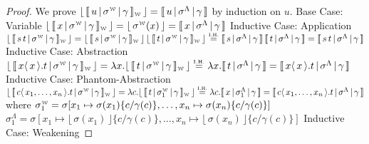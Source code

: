 \documentclass[a4paper,UKenglish,cleveref, autoref]{lipics-v2019}
\newcommand{\abs}[2]{\lambda #1 . #2}
\newcommand{\app}[2]{#1 \, #2}
\newcommand{\fake}[3]{#1 \langle \, #2 \, \rangle . #3}
\newcommand{\sub}[3]{#1 \{ #2 / #3 \}}
\newcommand{\weaksymbol}{\mbox{\tiny $\mathcal{W}$}}
\newcommand{\readbackwmap}[3]{\llbracket \, #1 \, \vert \, #2 \, \vert \, #3  \, \rrbracket }
\newcommand{\readweakwmap}[3]{\llbracket \, #1 \, \vert \, #2 \, \vert \, #3  \, \rrbracket_{\weaksymbol} }
\newcommand{\readbackweak}[1]{\lfloor \, #1 \, \rfloor}
\newcommand{\IH}{\stackrel{\hbox{\tiny I.H.}}{\hbox{=}}}
\begin{document}
\begin{proof}
We prove $\readbackweak{\readweakwmap{u}{\sigma^{\weaksymbol}}{\gamma}} = \readbackwmap{u}{\sigma^{\Lambda}}{\gamma}$ by induction on $u$.
\newline
\newline
Base Case: Variable
\newline
$\readbackweak{\readweakwmap{x}{\sigma^{\weaksymbol}}{\gamma}} = \readbackweak{\sigma^{\weaksymbol}(x)} = \readbackwmap{x}{\sigma^{\Lambda}}{\gamma}$
\newline
\newline
Inductive Case: Application
\newline
$\readbackweak{\readweakwmap{\app{s}{t}}{\sigma^{\weaksymbol}}{\gamma}} = \app{\readbackweak{\readweakwmap{s}{\sigma^{\weaksymbol}}{\gamma}}}{\readbackweak{\readweakwmap{t}{\sigma^{\weaksymbol}}{\gamma}}} \IH \app{\readbackwmap{s}{\sigma^{\Lambda}}{\gamma}}{\readbackwmap{t}{\sigma^{\Lambda}}{\gamma}} = \readbackwmap{\app{s}{t}}{\sigma^{\Lambda}}{\gamma}$
\newline
\newline
Inductive Case: Abstraction
\newline
$\readbackweak{\readweakwmap{\fake{x}{x}{t}}{\sigma^{\weaksymbol}}{\gamma}} = \abs{x}{\readbackweak{\readweakwmap{t}{\sigma^{\weaksymbol}}{\gamma}}} \IH \abs{x}{\readbackwmap{t}{\sigma^{\Lambda}}{\gamma}} = \readbackwmap{\fake{x}{x}{t}}{\sigma^{\Lambda}}{\gamma}$
\newline
\newline
Inductive Case: Phantom-Abstraction
\newline
$\readbackweak{\readweakwmap{\fake{c}{x_{1}, \dots, x_{n}}{t}}{\sigma^{\weaksymbol}}{\gamma}} = \abs{c}{\readbackweak{\readweakwmap{t}{\sigma_{1}^{\weaksymbol}}{\gamma}}} \IH \abs{c}{\readbackwmap{x}{\sigma_{1}^{\Lambda}}{\gamma}} = \readbackwmap{\fake{c}{x_{1}, \dots, x_{n}}{t}}{\sigma^{\Lambda}}{\gamma}$
\newline
where
\newline
$\sigma_{1}^{\weaksymbol} = \sigma [x_{1} \mapsto \sigma(x_{1}) \sub{}{c}{\gamma(c)}, \dots, x_{n} \mapsto \sigma(x_{n})  \sub{}{c}{\gamma(c)}]$
\newline
$\sigma_{1}^{\Lambda} = \sigma [x_{1} \mapsto \readbackweak{\sigma(x_{1})} \sub{}{c}{\gamma(c)}, \dots, x_{n} \mapsto \readbackweak{\sigma(x_{n})}  \sub{}{c}{\gamma(c)}]$
\newline
\newline
Inductive Case: Weakening
\newline

\end{proof}
\end{document}
